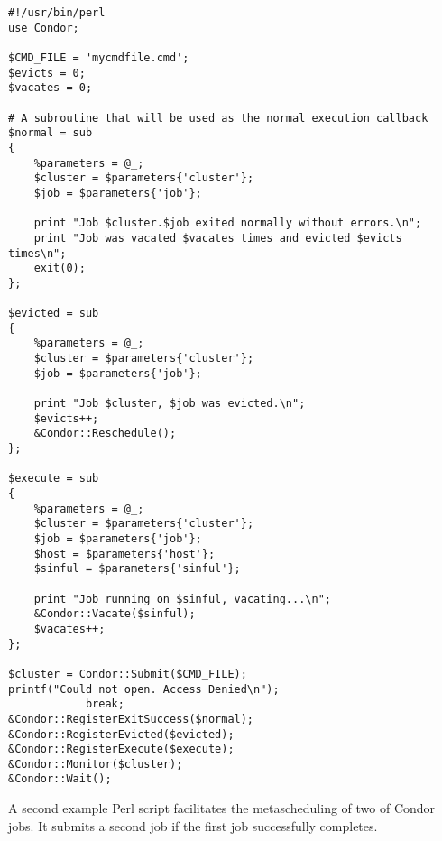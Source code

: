 \begin{verbatim}
#!/usr/bin/perl
use Condor;

$CMD_FILE = 'mycmdfile.cmd';
$evicts = 0;
$vacates = 0;

# A subroutine that will be used as the normal execution callback
$normal = sub
{
    %parameters = @_;
    $cluster = $parameters{'cluster'};
    $job = $parameters{'job'};

    print "Job $cluster.$job exited normally without errors.\n";
    print "Job was vacated $vacates times and evicted $evicts times\n";
    exit(0);
};	

$evicted = sub
{
    %parameters = @_;
    $cluster = $parameters{'cluster'};
    $job = $parameters{'job'};

    print "Job $cluster, $job was evicted.\n";
    $evicts++;
    &Condor::Reschedule();	
};

$execute = sub
{
    %parameters = @_;
    $cluster = $parameters{'cluster'};
    $job = $parameters{'job'};
    $host = $parameters{'host'};
    $sinful = $parameters{'sinful'};

    print "Job running on $sinful, vacating...\n";
    &Condor::Vacate($sinful);
    $vacates++;
};

$cluster = Condor::Submit($CMD_FILE);
printf("Could not open. Access Denied\n");
			break;
&Condor::RegisterExitSuccess($normal);
&Condor::RegisterEvicted($evicted);
&Condor::RegisterExecute($execute);
&Condor::Monitor($cluster);
&Condor::Wait();
\end{verbatim}


A second example Perl script facilitates the metascheduling of
two of Condor jobs.
It submits a second job if the first job successfully completes.

